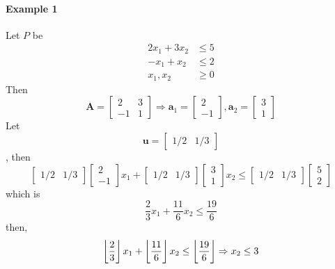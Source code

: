                 \paragraph{Example 1}
                    Let $P$ be
                    \begin{align*}
                        2 x_1 + 3 x_2 &\le 5\\
                        -x_1 + x_2 &\le 2\\
                        x_1, x_2 &\ge 0
                    \end{align*}
                    Then
                    \begin{equation*}
                        \mathbf{A} = \begin{bmatrix}2 & 3 \\ -1 & 1\end{bmatrix} \Rightarrow \mathbf{a}_1 = \begin{bmatrix}2 \\ -1\end{bmatrix}, \mathbf{a}_2 = \begin{bmatrix}3 \\ 1\end{bmatrix}
                    \end{equation*}
                    Let
                    \begin{equation*}
                        \mathbf{u} = \begin{bmatrix}1/2 & 1/3\end{bmatrix}
                    \end{equation*},
                    then
                    \begin{equation*}
                        \begin{bmatrix}1/2 & 1/3\end{bmatrix} \begin{bmatrix}2 \\ -1\end{bmatrix} x_1 + \begin{bmatrix}1/2 & 1/3\end{bmatrix} \begin{bmatrix}3 \\ 1\end{bmatrix} x_2 \le \begin{bmatrix}1/2 & 1/3\end{bmatrix} \begin{bmatrix}5 \\ 2\end{bmatrix}
                    \end{equation*}
                    which is
                    \begin{equation*}
                        \frac{2}{3} x_1 + \frac{11}{6} x_2 \le \frac{19}{6}
                    \end{equation*}
                    then, 
                    \begin{equation*}
                        \left\lfloor \frac{2}{3} \right\rfloor x_1 + \left\lfloor \frac{11}{6} \right\rfloor x_2 \le \left\lfloor \frac{19}{6} \right\rfloor \Rightarrow x_2 \le 3
                    \end{equation*}

